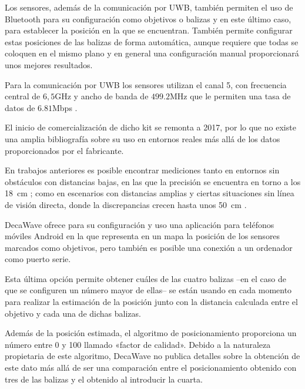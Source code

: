 Los sensores, además de la comunicación por UWB, también permiten el uso de Bluetooth para su configuración como objetivos o balizas y en este último caso, para establecer la posición en la que se encuentran.
También permite configurar estas posiciones de las balizas de forma automática, aunque requiere que todas se coloquen en el mismo plano y en general una configuración manual proporcionará unos mejores resultados.

Para la comunicación por UWB los sensores utilizan el canal 5, con frecuencia central de $6,5$GHz y ancho de banda de $499.2$MHz que le permiten una tasa de datos de $6.81$Mbps \cite{Decawave}.

El inicio de comercialización de dicho kit se remonta a 2017, por lo que no existe una amplia bibliografía sobre su uso en entornos reales más allá de los datos proporcionados por el fabricante.

En trabajos anteriores es posible encontrar mediciones tanto en entornos sin obstáculos con distancias bajas, en las que la precisión se encuentra en torno a los 18~cm \cite{Simedroni}; como en escenarios con distancias amplias y ciertas situaciones sin línea de visión directa, donde la discrepancias crecen hasta unos 50~cm \cite{jimenez, kulmer}.

DecaWave ofrece para su configuración y uso una aplicación para teléfonos móviles Android en la que representa en un mapa la posición de los sensores marcados como objetivos, pero también es posible una conexión a un ordenador como puerto serie.

Esta última opción permite obtener cuáles de las cuatro balizas --en el caso de que se configuren un número mayor de ellas-- se están usando en cada momento para realizar la estimación de la posición junto con la distancia calculada entre el objetivo y cada una de dichas balizas.

Además de la posición estimada, el algoritmo de posicionamiento proporciona un número entre 0 y 100 llamado «factor de calidad».
Debido a la naturaleza propietaria de este algoritmo, DecaWave no publica detalles sobre la obtención de este dato más allá de ser una comparación entre el posicionamiento obtenido con tres de las balizas y el obtenido al introducir la cuarta.

